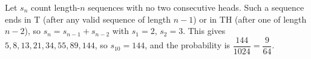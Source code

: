 Let $s_n$ count length-$n$ sequences with no two consecutive heads. Such a sequence ends in T (after any valid sequence of length $n-1$) or in TH (after one of length $n-2$), so $s_n=s_{n-1}+s_{n-2}$ with $s_1=2$, $s_2=3$. This gives $5,8,13,21,34,55,89,144$, so $s_{10}=144$, and the probability is $\dfrac{144}{1024}=\boxed{\dfrac9{64}}$.
